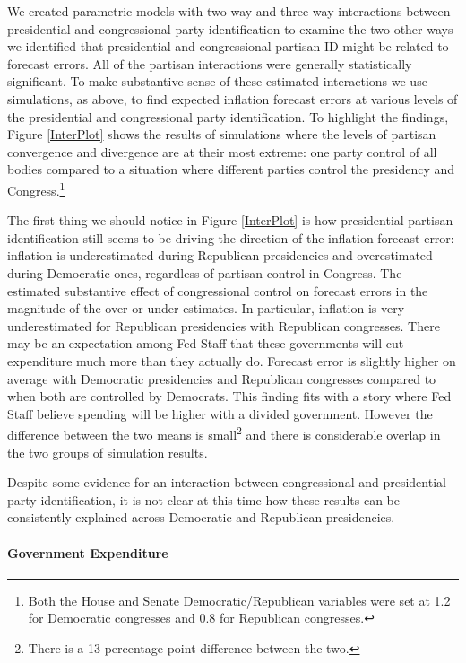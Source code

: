 \documentclass[a4paper]{article}\usepackage{graphicx, color}
\begin{document}
We created parametric models with two-way and three-way interactions between presidential and congressional party identification to examine the two other ways we identified that presidential and congressional partisan ID might be related to forecast errors. All of the partisan interactions were generally statistically significant. To make substantive sense of these estimated interactions we use simulations, as above, to find expected inflation forecast errors at various levels of the presidential and congressional party identification. To highlight the findings, Figure \ref{InterPlot} shows the results of simulations where the levels of partisan convergence and divergence are at their most extreme: one party control of all bodies compared to a situation where different parties control the presidency and Congress.\footnote{Both the House and Senate Democratic/Republican variables were set at 1.2 for Democratic congresses and 0.8 for Republican congresses.} 

The first thing we should notice in Figure \ref{InterPlot} is how presidential partisan identification still seems to be driving the direction of the inflation forecast error: inflation is underestimated during Republican presidencies and overestimated during Democratic ones, regardless of partisan control in Congress. The estimated substantive effect of congressional control on forecast errors in the magnitude of the over or under estimates. In particular, inflation is very underestimated for Republican presidencies with Republican congresses. There may be an expectation among Fed Staff that these governments will cut expenditure much more than they actually do. Forecast error is slightly higher on average with Democratic presidencies and Republican congresses compared to when both are controlled by Democrats. This finding fits with a story where Fed Staff believe spending will be higher with a divided government. However the difference between the two means is small\footnote{There is a 13 percentage point difference between the two.} and there is considerable overlap in the two groups of simulation results.

Despite some evidence for an interaction between congressional and presidential party identification, it is not clear at this time how these results can be consistently explained across Democratic and Republican presidencies. 

\paragraph{Government Expenditure}
\end{document}
